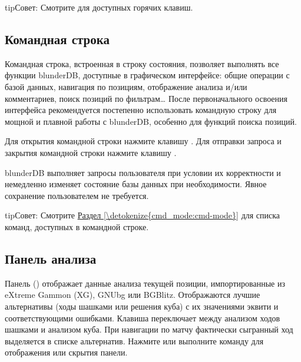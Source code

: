 \documentclass[letterpaper,10pt,russian]{sphinxmanual}
\begin{document}
\begin{sphinxadmonition}{tip}{Совет:}
\sphinxAtStartPar
Смотрите {\hyperref[\detokenize{raccourcis:raccourcis}]{}} для доступных горячих клавиш.
\end{sphinxadmonition}


\subsection{Командная строка}
\label{\detokenize{manuel:la-ligne-de-commande}}\label{\detokenize{manuel:ligne-commande}}
\sphinxAtStartPar
Командная строка, встроенная в строку состояния, позволяет выполнять все функции blunderDB, доступные в графическом интерфейсе: общие операции с базой данных, навигация по позициям, отображение анализа и/или комментариев, поиск позиций по фильтрам… После первоначального освоения интерфейса рекомендуется постепенно использовать командную строку для мощной и плавной работы с blunderDB, особенно для функций поиска позиций.

\sphinxAtStartPar
Для открытия командной строки нажмите клавишу . Для отправки запроса и закрытия командной строки нажмите клавишу .

\sphinxAtStartPar
blunderDB выполняет запросы пользователя при условии их корректности и немедленно изменяет состояние базы данных при необходимости. Явное сохранение пользователем не требуется.

\begin{sphinxadmonition}{tip}{Совет:}
\sphinxAtStartPar
Смотрите \hyperref[\detokenize{cmd_mode:cmd-mode}]{Раздел \ref{\detokenize{cmd_mode:cmd-mode}}} для списка команд, доступных в командной строке.
\end{sphinxadmonition}


\subsection{Панель анализа}
\label{\detokenize{manuel:panneau-analyse}}\label{\detokenize{manuel:id3}}
\sphinxAtStartPar
Панель  () отображает данные анализа текущей позиции, импортированные из eXtreme Gammon (XG), GNUbg или BGBlitz. Отображаются лучшие альтернативы (ходы шашками или решения куба) с их значениями эквити и соответствующими ошибками. Клавиша  переключает между анализом ходов шашками и анализом куба. При навигации по матчу фактически сыгранный ход выделяется в списке альтернатив. Нажмите  или выполните команду  для отображения или скрытия панели.
\end{document}
